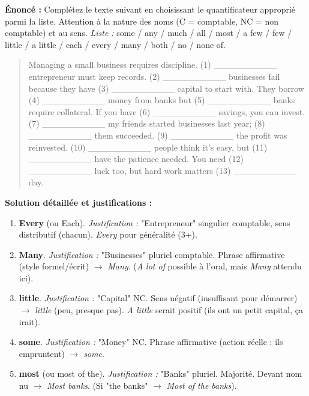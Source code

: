 \documentclass[11pt]{article}
\newcommand{\cle}[1]{{\popxbold\color{popdark}#1}}
\begin{document}
\begin{exoresolu}
    \textbf{Énoncé :} Complétez le texte suivant en choisissant le quantificateur approprié parmi la liste. Attention à la nature des noms (C = comptable, NC = non comptable) et au sens.
    \textit{Liste :} \cle{some} / \cle{any} / \cle{much} / \cle{all} / \cle{most} / \cle{a few} / \cle{few} / \cle{little} / \cle{a little} / \cle{each} / \cle{every} / \cle{many} / \cle{both} / \cle{no} / \cle{none of}.
    \begin{quote}
        Managing a small business requires discipline. (1) \_\_\_\_\_\_\_\_\_\_ entrepreneur must keep records. (2) \_\_\_\_\_\_\_\_\_\_ businesses fail because they have (3) \_\_\_\_\_\_\_\_\_\_ capital to start with. They borrow (4) \_\_\_\_\_\_\_\_\_\_ money from banks but (5) \_\_\_\_\_\_\_\_\_\_ banks require collateral. If you have (6) \_\_\_\_\_\_\_\_\_\_ savings, you can invest. (7) \_\_\_\_\_\_\_\_\_\_ my friends started businesses last year; (8) \_\_\_\_\_\_\_\_\_\_ them succeeded. (9) \_\_\_\_\_\_\_\_\_\_ the profit was reinvested. (10) \_\_\_\_\_\_\_\_\_\_ people think it's easy, but (11) \_\_\_\_\_\_\_\_\_\_ have the patience needed. You need (12) \_\_\_\_\_\_\_\_\_\_ luck too, but hard work matters (13) \_\_\_\_\_\_\_\_\_\_ day.
    \end{quote}
    \tcblower
    \textbf{Solution détaillée et justifications :}
    \begin{enumerate}
        \item \textbf{\cle{Every}} (ou \cle{Each}). \textit{Justification :} "Entrepreneur" singulier comptable, sens distributif (chacun). \emph{Every} pour généralité (3+).
        \item \textbf{\cle{Many}}. \textit{Justification :} "Businesses" pluriel comptable. Phrase affirmative (style formel/écrit) $\rightarrow$ \emph{Many}. (\emph{A lot of} possible à l'oral, mais \emph{Many} attendu ici).
        \item \textbf{\cle{little}}. \textit{Justification :} "Capital" NC. Sens négatif (insuffisant pour démarrer) $\rightarrow$ \emph{little} (peu, presque pas). \emph{A little} serait positif (ils ont un petit capital, ça irait).
        \item \textbf{\cle{some}}. \textit{Justification :} "Money" NC. Phrase affirmative (action réelle : ils empruntent) $\rightarrow$ \emph{some}.
        \item \textbf{\cle{most}} (ou \cle{most of the}). \textit{Justification :} "Banks" pluriel. Majorité. Devant nom nu $\rightarrow$ \emph{Most banks}. (Si "the banks" $\rightarrow$ \emph{Most of the banks}).

\end{enumerate}
\end{exoresolu}
\end{document}
